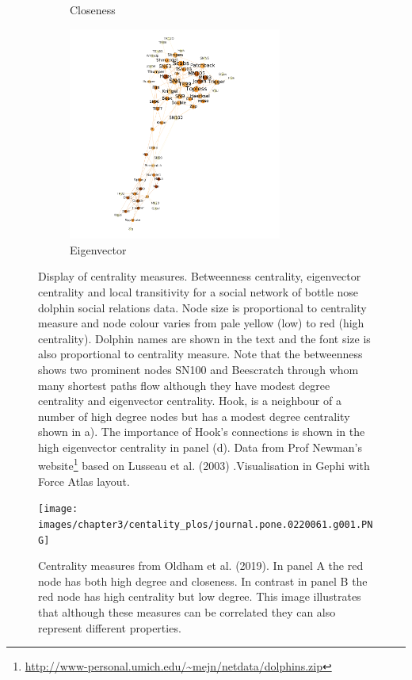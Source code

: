 \begin{figure}
\begin{subfigure}{7cm}
    \caption{Closeness}
  \end{subfigure}
  \begin{subfigure}{7cm}
    \centering\includegraphics[width=7cm]{images/chapter3/dolphin/eig.png}
    \caption{Eigenvector}
  \end{subfigure}
  \caption[\textbf{Illustation of entrality measures} in a dolphin social network.]{Display of centrality measures. Betweenness centrality, eigenvector centrality and local transitivity for a social network of bottle nose dolphin social relations data. Node size is proportional to centrality measure and node colour varies from pale yellow (low) to red (high centrality). Dolphin names are shown in the text and the font size is also proportional to centrality measure. Note that the betweenness shows two prominent nodes SN100 and Beescratch through whom many shortest paths flow although they have modest degree centrality and eigenvector centrality. Hook, is a neighbour of a number of high degree nodes but has a modest degree centrality shown in a). The importance of Hook's connections is shown in the high eigenvector centrality in panel (d). Data from Prof Newman's website\footnote{\url{http://www-personal.umich.edu/~mejn/netdata/dolphins.zip}} based on Lusseau et al. (2003) \cite{lusseau2003bottlenose}.Visualisation in Gephi with Force Atlas layout. }
  \label{fig:dolphin_multipanel}
\end{figure}
\begin{figure}
    \centering
    \texttt{[image: images/chapter3/centality\_plos/journal.pone.0220061.g001.PNG]}
    \caption{Centrality measures from Oldham et al. (2019)\cite{oldham2019consistency}. In panel A the red node has both high degree and closeness. In contrast in panel B the red node has high centrality but low degree. This image illustrates that although these measures can be correlated they can also represent different properties.}
    \label{fig:centrality measures from Plos}
\end{figure}

